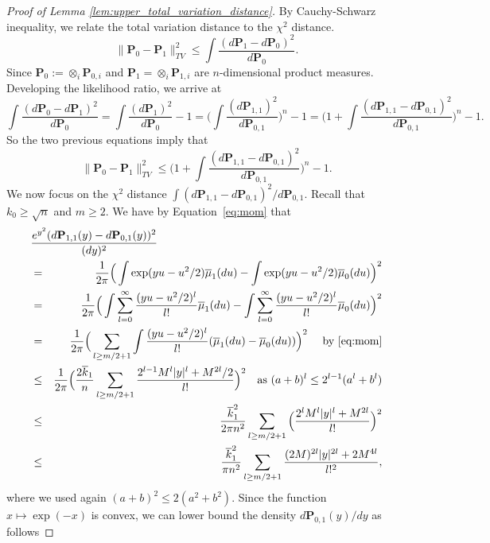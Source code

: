 \documentclass[twoside,11pt]{article}
\def\beq{\begin{equation}}
\def\eeq{\end{equation}}
\newcommand{\<}{\langle}
\renewcommand{\>}{\rangle}
\begin{document}
\begin{proof}[Proof of Lemma \ref{lem:upper_total_variation_distance}]
By Cauchy-Schwarz inequality, we relate the total variation distance to the $\chi^2$ distance.
$$\|{\mathbf  P}_0 - {\mathbf  P}_1\|_{TV}^2 \leq \int \frac{(d{\mathbf  P}_1 - d{\mathbf  P}_0)^2}{d{\mathbf  P}_0}.$$
Since ${\mathbf  P}_0:= \otimes_{i} {\mathbf P}_{0,i} $ and ${\mathbf  P}_1=\otimes_{i} {\mathbf P}_{1,i} $ are $n$-dimensional  product measures. Developing the likelihood ratio, we arrive at
$$ \int \frac{(d{\mathbf  P}_0  - d{\mathbf  P}_1 )^2}{d{\mathbf  P}_0} =  \int \frac{(d{\mathbf  P}_1)^2}{d{\mathbf  P}_0} - 1 = \Big(\int \frac{(d{\mathbf P}_{1,1})^2}{d{\mathbf P}_{0,1}}\Big)^{ n} -1 = \Big(1 + \int \frac{(d{\mathbf P}_{1,1}-d{\mathbf P}_{0,1})^2}{d{\mathbf P}_{0,1}}\Big)^{ n} -1.$$
So the two previous equations imply that
\beq\label{eq:TV}
\|{\mathbf  P}_0 - {\mathbf  P}_1\|_{TV}^2 \leq \Big(1 + \int \frac{(d{\mathbf P}_{1,1}-d{\mathbf P}_{0,1})^2}{d{\mathbf P}_{0,1}}\Big)^{ n} -1.
\eeq
We now focus on the $\chi^2$ distance $\int (d{\mathbf P}_{1,1}-d{\mathbf P}_{0,1})^2/d{\mathbf P}_{0,1}$. 
Recall that $k_0\geq \sqrt{n}$ and $m\geq 2$. We have by Equation~\eqref{eq:mom} that
\begin{eqnarray}
\lefteqn{\frac{e^{y^2}(d{\mathbf P}_{1,1}(y) - d{\mathbf P}_{0,1}(y))^2}{(dy)^2}} \nonumber&&\\ &=& \frac{1}{2\pi} \Big( \int \exp(yu - u^2/2) \overline{\mu}_1(du) -  \int \exp(yu - u^2/2) \overline{\mu}_0(du)\Big)^2\nonumber\\
&=&\frac{1}{2\pi} \Big( \int \sum_{l=0}^{\infty} \frac{(yu - u^2/2)^l}{ l!} \overline{\mu}_1(du) -  \int \sum_{l=0}^{\infty} \frac{(yu - u^2/2)^l}{ l!} \overline{\mu}_0(du)\Big)^2\nonumber\\
&=&\frac{1}{2\pi} \Big( \sum_{l\geq m/2 +1} \int  \frac{(yu - u^2/2)^l}{ l!} (\overline{\mu}_1(du) -  \overline{\mu}_0(du))\Big)^2\quad \text{ by \eqref{eq:mom}}\nonumber\\
&\leq&\frac{1}{2\pi} \Big( \frac{ 2\overline{k}_1}{ n}\sum_{l\geq m/2 +1}  \frac{2^{l-1}M^l|y|^l+ M^{2l}/2}{ l!} \Big)^2 \quad \text{as $(a+b)^l\leq 2^{l-1}(a^l+b^l)$}\nonumber\\
&\leq &\frac{ \overline{k}_1^2}{2\pi n^2} \sum_{l\geq m/2 +1}  \Big(\frac{2^lM^l|y|^l+ M^{2l}}{ l!} \Big)^2\nonumber\\
&\leq &\frac{ \overline{k}_1^2}{\pi  n^2} \sum_{l\geq m/2 +1}  \frac{(2M)^{2l}|y|^{2l}+ 2M^{4l}}{ l!^2},
\label{eq:noundmo}
\end{eqnarray}
where we used again $(a+b)^2\leq 2(a^2+b^2)$. Since the function $x\mapsto \exp(-x)$ is convex, we can lower bound the density $d{\mathbf P}_{0,1} (y)/dy$ as follows

\end{proof}
\end{document}
